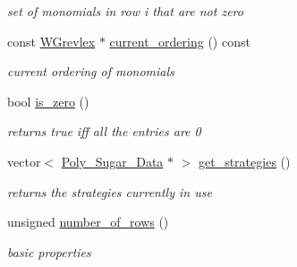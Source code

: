 \begin{Indent}
\begin{DoxyCompactItemize}
\begin{DoxyCompactList}\small\item\em set of monomials in row {\ttfamily i} that are not zero \end{DoxyCompactList}\item 
\mbox{\label{group___g_b_computation_ad7c37d08523c27bbb1990534abd95461}} 
const \hyperlink{group__orderinggroup_class_w_grevlex}{W\+Grevlex} $\ast$ \hyperlink{group___g_b_computation_ad7c37d08523c27bbb1990534abd95461}{current\+\_\+ordering} () const
\begin{DoxyCompactList}\small\item\em current ordering of monomials \end{DoxyCompactList}\item 
\mbox{\label{group___g_b_computation_aee8c1358071a26e60b2e50f9678dcfb0}} 
bool \hyperlink{group___g_b_computation_aee8c1358071a26e60b2e50f9678dcfb0}{is\+\_\+zero} ()
\begin{DoxyCompactList}\small\item\em returns {\ttfamily true} iff all the entries are 0 \end{DoxyCompactList}\item 
\mbox{\label{group___g_b_computation_a1e58764d1bee3437e2bfa74fbb847b1a}} 
vector$<$ \hyperlink{group__strategygroup_class_poly___sugar___data}{Poly\+\_\+\+Sugar\+\_\+\+Data} $\ast$ $>$ \hyperlink{group___g_b_computation_a1e58764d1bee3437e2bfa74fbb847b1a}{get\+\_\+strategies} ()
\begin{DoxyCompactList}\small\item\em returns the strategies currently in use \end{DoxyCompactList}\item 
\mbox{\label{group___g_b_computation_ac56c717e4015d655e40b2c8033fa9d92}} 
unsigned \hyperlink{group___g_b_computation_ac56c717e4015d655e40b2c8033fa9d92}{number\+\_\+of\+\_\+rows} ()
\begin{DoxyCompactList}\small\item\em basic properties \end{DoxyCompactList}\end{DoxyCompactItemize}
\end{Indent}
